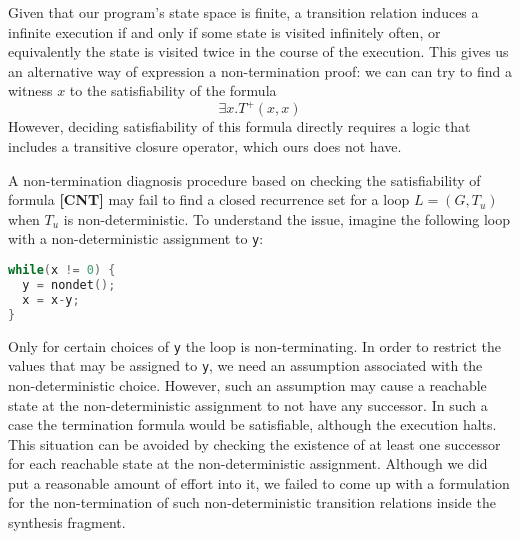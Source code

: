 \documentclass[preprint]{sigplanconf}
\theoremstyle{definition}
\begin{document}
Given that our program's state space is finite, a transition relation
induces a infinite execution if and only if some state is visited infinitely
often, or equivalently the state is visited twice in the course of the
execution.  This gives us an alternative way of expression a non-termination
proof: we can can try to find a witness $x$ to the satisfiability of the
formula
%
$$ \exists x . T^+(x, x)$$
%
However, deciding satisfiability of this formula directly requires a logic
that includes a transitive closure operator, which ours does not have.

 A non-termination diagnosis procedure based
on checking the satisfiability of formula {\bf [CNT]} may fail to find a
closed recurrence set for a loop $L=(G, T_u)$ when $T_u$ is
non-deterministic.  To understand the issue, imagine the following loop with
a non-deterministic assignment to \lstinline!y!:
%
\begin{lstlisting}[language=C]
while(x != 0) {
  y = nondet();
  x = x-y;
}
\end{lstlisting}

Only for certain choices of \texttt{y} the loop is non-terminating.  In
order to restrict the values that may be assigned to \texttt{y}, we need an
assumption associated with the non-deterministic choice.  However, such an
assumption may cause a reachable state at the non-deterministic assignment
to not have any successor.  In such a case the termination formula would be
satisfiable, although the execution halts.  This situation can be avoided by
checking the existence of at least one successor for each reachable state at
the non-deterministic assignment.  Although we did put a reasonable amount
of effort into it, we failed to come up with a formulation for the
non-termination of such non-deterministic transition relations inside the
synthesis fragment.

\end{document}
